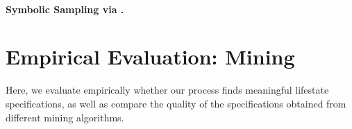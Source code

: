 \documentclass[10pt,reprint,nocopyrightspace,numbers]{sigplanconf}
\begin{document}
%
%

\paragraph{Symbolic Sampling via \sharpsat.}






\section{Empirical Evaluation: Mining}
\label{sec:evaluation}

Here, we evaluate empirically whether our process finds meaningful lifestate specifications, as well as compare the quality of the specifications obtained from different mining algorithms.
\end{document}
